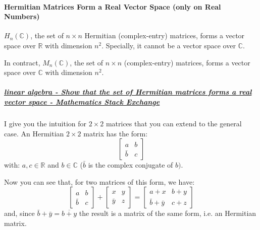 \paragraph{Hermitian Matrices Form a Real Vector Space (only on Real Numbers)}

\begin{theorem}
    $H_n(\mathbb{C})$, the set of $n \times n$ Hermitian (complex-entry) matrices, forms a vector space over $\mathbb{R}$ with dimension $n^2$. Specially, it cannot be a vector space over $\mathbb{C}.$
\end{theorem}

\begin{remark}
   In contract, $M_n(\mathbb{C})$, the set of $n \times n$ (complex-entry) matrices, forms a vector space over $\mathbb{C}$ with dimension $n^2$.
\end{remark}

\subparagraph{\href{https://math.stackexchange.com/questions/1630604/show-that-the-set-of-hermitian-matrices-forms-a-real-vector-space}{linear algebra - Show that the set of Hermitian matrices forms a real vector space - Mathematics Stack Exchange} 
}
I give you the intuition for $2 \times 2$ matrices that you can extend to the general case.
An Hermitian $2 \times 2$ matrix has the form:
\begin{equation}
    \left[\begin{array}{ll}
a & b \\
\bar{b} & c
\end{array}\right]
\end{equation}
with: $a, c \in \mathbb{R}$ and $b \in \mathbb{C}$ ($\bar{b}$ is the complex conjugate of $b)$.

Now you can see that, for two matrices of this form, we have:
\begin{equation}
    \left[\begin{array}{ll}
a & b \\
\bar{b} & c
\end{array}\right]+\left[\begin{array}{ll}
x & y \\
\bar{y} & z
\end{array}\right]=\left[\begin{array}{ll}
a+x & b+y \\
\bar{b}+\bar{y} & c+z
\end{array}\right]
\end{equation}
and, since $\bar{b}+\bar{y}=\overline{b+y}$ the result is a matrix of the same form, i.e. an Hermitian matrix.

